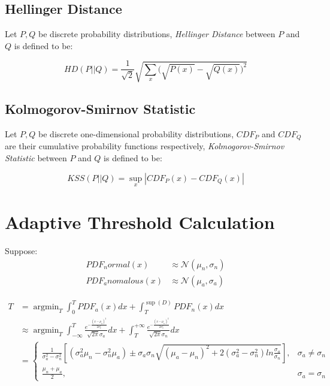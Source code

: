 \documentclass[10pt,conference,letterpaper]{article}
\begin{document}
		\subsection{Hellinger Distance}
			Let $P,Q$ be discrete probability distributions, \textit{Hellinger Distance} between $P$ and $Q$ is defined to be:
		
			\begin{equation}
				HD(P||Q) = \frac{1}{\sqrt{2}}\sqrt{\sum_x\bigg(\sqrt{P(x)} - \sqrt{Q(x)}\bigg)^2}
			\end{equation}
		
		\subsection{Kolmogorov-Smirnov Statistic}
			Let $P,Q$ be discrete one-dimensional probability distributions, $CDF_P$ and $CDF_Q$ are their cumulative probability functions respectively, \textit{Kolmogorov-Smirnov Statistic} between $P$ and $Q$ is defined to be:
			
			\begin{equation}
				KSS(P||Q) = \sup_x | CDF_P(x) - CDF_Q(x) |
			\end{equation}
			
	\section{Adaptive Threshold Calculation}
		Suppose:
		\begin{align}
			PDF_normal(x) &\approx \mathcal{N}(\mu_n, \sigma_n)\\
			PDF_anomalous(x) &\approx \mathcal{N}(\mu_a, \sigma_a)
		\end{align}
		
		\begin{align}\label{equ:equal-weight}
			T &= \mathop{\arg\min}_{T} \int_{0}^{T}PDF_{a}(x)dx +
			\int_{T}^{\sup(D)}PDF_{n}(x)dx \nonumber\\
			& \approx \mathop{\arg\min}_{T}
			\int_{-\infty}^{T}
			\frac{e^{-\frac{(x - \mu_a)^2}{2\sigma_a^2}}}{\sqrt{2\pi} \sigma_a}dx
			+ \int_{T}^{+\infty}
			\frac{e^{-\frac{(x - \mu_n)^2}{2\sigma_n^2}}}{\sqrt{2\pi} \sigma_n}dx \nonumber\\
			& = \begin{cases}
				\displaystyle
				\frac{1}{\sigma_a^2 - \sigma_n^2}\left[(\sigma_a^2\mu_n - \sigma_n^2\mu_a) \pm \sigma_a\sigma_n\sqrt{(\mu_a - \mu_n)^2 + 2(\sigma_a^2 - \sigma_n^2)ln\frac{\sigma_a}{\sigma_n}}\right], & \sigma_a \ne \sigma_n\\
				\displaystyle \frac{\mu_n + \mu_a}{2}, & \sigma_a = \sigma_n
			\end{cases}
		\end{align}
		
\end{document}
